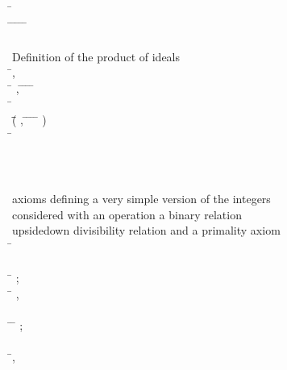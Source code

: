 \begin{hetcasl}
\>\> \Ax{\bullet} \=   \\
\>\>\> \Ax{\Leftrightarrow} \=\Ax{\forall}  \Ax{:}  \Ax{\bullet} \=   \Ax{\Rightarrow} \=\Ax{\exists}  \Ax{:}  \Ax{\bullet} \= \Ax{=} \= \Ax{*} \\
\> \\
\> {\small{}\KW{\%\%} Definition of the product of ideals}\\
\> \Ax{\forall} \=,  \Ax{:}  \\
\> \Ax{\bullet} \=\Ax{\forall} ,  \Ax{:}  \Ax{\bullet} \=   \Ax{\wedge} \=   \Ax{\Rightarrow} \= \Ax{*}   \= \Ax{**} \\
\> \Ax{\bullet} \=\Ax{\forall}  \Ax{:}  \\
\>\> \Ax{\bullet} \=(\=\Ax{\forall} ,  \Ax{:}  \Ax{\bullet} \=   \Ax{\wedge} \=   \Ax{\Rightarrow} \= \Ax{*}   \= \Ax{**} ) \\
\>\>\> \Ax{\Rightarrow} \= \Ax{**}   \\
\\
\\
\\
{\small{}\KW{\%\%}\Ax{\%} axioms defining a very simple version of the integers\Ax{,}}\\
{\small{}\KW{\%\%}\Ax{\%} considered with an operation \Ax{*}\Ax{,} a binary relation \Ax{|}\Ax{|}}\\
{\small{}\KW{\%\%}\Ax{\%} \Ax{(}upside\Ax{-}down divisibility relation\Ax{)} and a primality axiom}\\
\SPEC \= \Ax{=}\\
\> \SORT {}\\
\> \OPS \= \Ax{:} ;\\
\>\> \Ax{\_\_}\Ax{\_\_} \Ax{:} \= \Ax{\times}  \Ax{\rightarrow} , \\
\>\>  \\
\> \PREDS \=\Ax{\_\_}\Ax{||}\Ax{\_\_} \Ax{:} \= \Ax{\times} ;\\
\>\>  \Ax{:} \\
\> \Ax{\forall} \=,  \Ax{:}  \\

\end{hetcasl}
